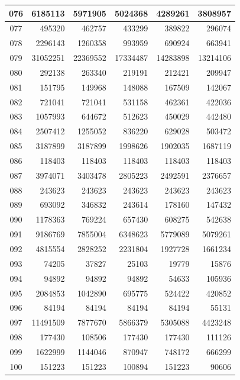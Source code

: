 \begin{longtable}{|c|r|r|r|r|r|}
\hline
076 & 6185113 & 5971905 & 5024368 & 4289261 & 3808957 \\
\hline
077 & 495320 & 462757 & 433299 & 389822 & 296074 \\
\hline
078 & 2296143 & 1260358 & 993959 & 690924 & 663941 \\
\hline
079 & 31052251 & 22369552 & 17334487 & 14283898 & 13214106 \\
\hline
080 & 292138 & 263340 & 219191 & 212421 & 209947 \\
\hline
081 & 151795 & 149968 & 148088 & 167509 & 142067 \\
\hline
082 & 721041 & 721041 & 531158 & 462361 & 422036 \\
\hline
083 & 1057993 & 644672 & 512623 & 450029 & 442480 \\
\hline
084 & 2507412 & 1255052 & 836220 & 629028 & 503472 \\
\hline
085 & 3187899 & 3187899 & 1998626 & 1902035 & 1687119 \\
\hline
086 & 118403 & 118403 & 118403 & 118403 & 118403 \\
\hline
087 & 3974071 & 3403478 & 2805223 & 2492591 & 2376657 \\
\hline
088 & 243623 & 243623 & 243623 & 243623 & 243623 \\
\hline
089 & 693092 & 346832 & 243614 & 178160 & 147432 \\
\hline
090 & 1178363 & 769224 & 657430 & 608275 & 542638 \\
\hline
091 & 9186769 & 7855004 & 6348623 & 5779089 & 5079261 \\
\hline
092 & 4815554 & 2828252 & 2231804 & 1927728 & 1661234 \\
\hline
093 & 74205 & 37827 & 25103 & 19779 & 15876 \\
\hline
094 & 94892 & 94892 & 94892 & 54633 & 105936 \\
\hline
095 & 2084853 & 1042890 & 695775 & 524422 & 420852 \\
\hline
096 & 84194 & 84194 & 84194 & 84194 & 55131 \\
\hline
097 & 11491509 & 7877670 & 5866379 & 5305088 & 4423248 \\
\hline
098 & 177430 & 108506 & 177430 & 177430 & 111126 \\
\hline
099 & 1622999 & 1144046 & 870947 & 748172 & 666299 \\
\hline
100 & 151223 & 151223 & 100894 & 151223 & 90606 \\
\hline
\end{longtable}
\normalsize
\renewcommand{\arraystretch}{1.2}


